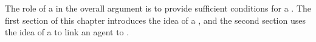 \begin{note}
  The role of a  in the overall argument is to provide sufficient conditions for a \requ{}.
  The first section of this chapter introduces the idea of a , and the second section uses the idea of a  to link an agent \tCN{} to .
\end{note}


\section{}
\label{cha:typical:int}






\subsection{}
\label{cha:typical:tCDef:ToRdef}


